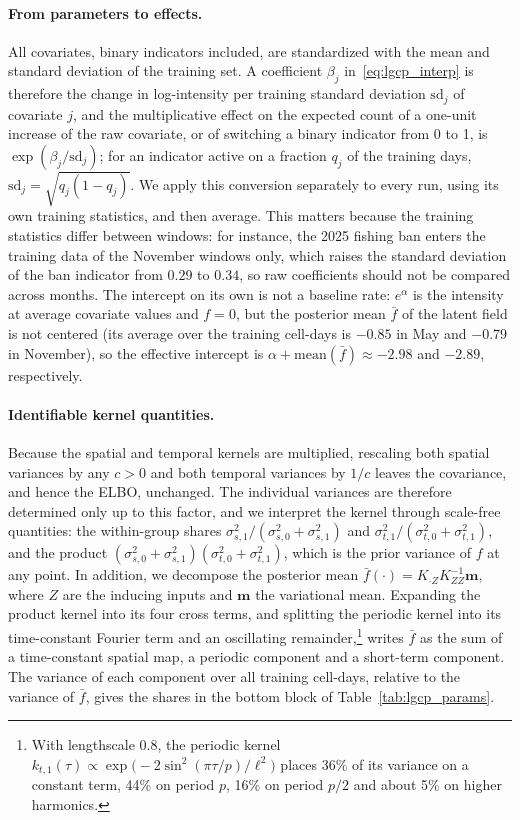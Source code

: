 \paragraph{From parameters to effects.}
All covariates, binary indicators included, are standardized with the mean and standard deviation of the training set. A coefficient $\beta_j$ in~\eqref{eq:lgcp_interp} is therefore the change in log-intensity per training standard deviation $\mathrm{sd}_j$ of covariate $j$, and the multiplicative effect on the expected count of a one-unit increase of the raw covariate, or of switching a binary indicator from 0 to 1, is $\exp(\beta_j/\mathrm{sd}_j)$; for an indicator active on a fraction $q_j$ of the training days, $\mathrm{sd}_j=\sqrt{q_j(1-q_j)}$. We apply this conversion separately to every run, using its own training statistics, and then average. This matters because the training statistics differ between windows: for instance, the 2025 fishing ban enters the training data of the November windows only, which raises the standard deviation of the ban indicator from $0.29$ to $0.34$, so raw coefficients should not be compared across months. The intercept on its own is not a baseline rate: $e^{\alpha}$ is the intensity at average covariate values and $f=0$, but the posterior mean $\bar f$ of the latent field is not centered (its average over the training cell-days is $-0.85$ in May and $-0.79$ in November), so the effective intercept is $\alpha+\mathrm{mean}(\bar f)\approx-2.98$ and $-2.89$, respectively.

\paragraph{Identifiable kernel quantities.}
Because the spatial and temporal kernels are multiplied, rescaling both spatial variances by any $c>0$ and both temporal variances by $1/c$ leaves the covariance, and hence the ELBO, unchanged. The individual variances are therefore determined only up to this factor, and we interpret the kernel through scale-free quantities: the within-group shares $\sigma^2_{s,1}/(\sigma^2_{s,0}+\sigma^2_{s,1})$ and $\sigma^2_{t,1}/(\sigma^2_{t,0}+\sigma^2_{t,1})$, and the product $(\sigma^2_{s,0}+\sigma^2_{s,1})(\sigma^2_{t,0}+\sigma^2_{t,1})$, which is the prior variance of $f$ at any point. In addition, we decompose the posterior mean $\bar f(\cdot)=K_{\cdot Z}K_{ZZ}^{-1}\mathbf{m}$, where $Z$ are the inducing inputs and $\mathbf{m}$ the variational mean. Expanding the product kernel into its four cross terms, and splitting the periodic kernel into its time-constant Fourier term and an oscillating remainder,\footnote{With lengthscale $0.8$, the periodic kernel $k_{t,1}(\tau)\propto\exp\bigl(-2\sin^2(\pi\tau/p)/\ell^2\bigr)$ places 36\% of its variance on a constant term, 44\% on period $p$, 16\% on period $p/2$ and about 5\% on higher harmonics.} writes $\bar f$ as the sum of a time-constant spatial map, a periodic component and a short-term component. The variance of each component over all training cell-days, relative to the variance of $\bar f$, gives the shares in the bottom block of Table~\ref{tab:lgcp_params}.

